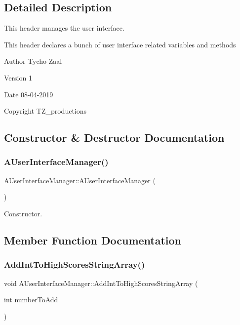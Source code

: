 \subsection{Detailed Description}
This header manages the user interface. 

This header declares a bunch of user interface related variables and methods \begin{DoxyAuthor}{Author}
Tycho Zaal 
\end{DoxyAuthor}
\begin{DoxyVersion}{Version}
1 
\end{DoxyVersion}
\begin{DoxyDate}{Date}
08-\/04-\/2019 
\end{DoxyDate}
\begin{DoxyCopyright}{Copyright}
T\+Z\+\_\+productions 
\end{DoxyCopyright}


\subsection{Constructor \& Destructor Documentation}
\mbox{\label{class_a_user_interface_manager_a87749ed98cd7568c5de320bd6a9282ec}} 
\subsubsection{AUserInterfaceManager()}
{\footnotesize\ttfamily A\+User\+Interface\+Manager\+::\+A\+User\+Interface\+Manager (\begin{DoxyParamCaption}{ }\end{DoxyParamCaption})}



Constructor. 



\subsection{Member Function Documentation}
\mbox{\label{class_a_user_interface_manager_afa99d2da551223255ec04b264c0666ad}} 
\subsubsection{AddIntToHighScoresStringArray()}
{\footnotesize\ttfamily void A\+User\+Interface\+Manager\+::\+Add\+Int\+To\+High\+Scores\+String\+Array (\begin{DoxyParamCaption}\item[{int}]{number\+To\+Add }\end{DoxyParamCaption})}



